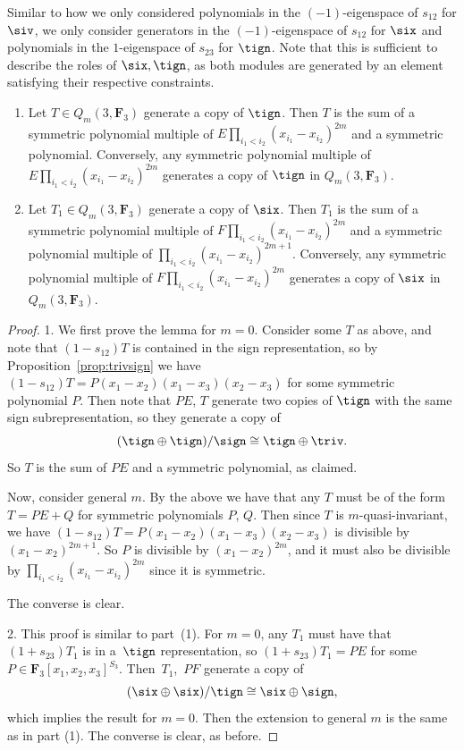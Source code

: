  Similar to how we only considered polynomials in the $(-1)$-eigenspace of $s_{12}$ for $\siv$, we only consider generators in the $(-1)$-eigenspace of $s_{12}$ for $\six$ and polynomials in the $1$-eigenspace of $s_{23}$ for $\tign$. Note that this is sufficient to describe the roles of $\six,\tign$, as both modules are generated by an element satisfying their respective constraints.

 \begin{Lemma}\label{lem:sixgen}
 \quad
 \begin{enumerate}\itemsep=0pt
\item[$1.$] Let $T\in Q_m(3,\mathbf{F}_3)$ generate a copy of $\tign$. Then $T$ is the sum of a symmetric polynomial multiple of $E\prod_{i_1<i_2}(x_{i_1}-x_{i_2})^{2m}$ and a symmetric polynomial. Conversely, any symmetric polynomial multiple of $E\prod_{i_1<i_2}(x_{i_1}-x_{i_2})^{2m}$ generates a copy of $\tign$ in $Q_m(3,\mathbf{F}_3)$.
\item[$2.$] Let $T_1\in Q_m(3,\mathbf{F}_3)$ generate a copy of $\six$. Then $T_1$ is the sum of a symmetric polynomial multiple of $F\prod_{i_1<i_2}(x_{i_1}-x_{i_2})^{2m}$ and a symmetric polynomial multiple of $\prod_{i_1<i_2}(x_{i_1}-x_{i_2})^{2m+1}$. Conversely, any symmetric polynomial multiple of $F\prod_{i_1<i_2}(x_{i_1}-x_{i_2})^{2m}$ generates a copy of $\six$ in $Q_m(3,\mathbf{F}_3)$.
 \end{enumerate}
 \end{Lemma}

 \begin{proof}
 1. We first prove the lemma for $m=0$. Consider some $T$ as above, and note that $(1-s_{12})T$ is contained in the sign representation, so by Proposition~\ref{prop:trivsign} we have $(1-s_{12})T=P(x_1-x_2)(x_1-x_3)(x_2-x_3)$ for some symmetric polynomial $P$. Then note that $PE$, $T$ generate two copies of $\tign$ with the same sign subrepresentation, so they generate a copy of
 \[(\tign\oplus\tign)/\sign\cong\tign\oplus\triv.\]
 So $T$ is the sum of $PE$ and a symmetric polynomial, as claimed.

 Now, consider general $m$. By the above we have that any $T$ must be of the form $T=PE+Q$ for symmetric polynomials $P$, $Q$. Then since $T$ is $m$-quasi-invariant, we have $(1-s_{12})T=P(x_1-x_2)(x_1-x_3)(x_2-x_3)$ is divisible by $(x_1-x_2)^{2m+1}$. So $P$ is divisible by $(x_1-x_2)^{2m}$, and it must also be divisible by $\prod_{i_1<i_2}(x_{i_1}-x_{i_2})^{2m}$ since it is symmetric.

 The converse is clear.

 2. This proof is similar to part~(1). For $m=0$, any $T_1$ must have that $(1+s_{23})T_1$ is in a~$\tign$ representation, so $(1+s_{23})T_1=PE$ for some $P\in\mathbf{F}_3[x_1,x_2,x_3]^{S_3}$. Then~$T_1$,~$PF$ generate a copy of
 \[(\six\oplus\six)/\tign\cong\six\oplus\sign,\]
 which implies the result for $m=0$. Then the extension to general $m$ is the same as in part (1). The converse is clear, as before.
 \end{proof}

